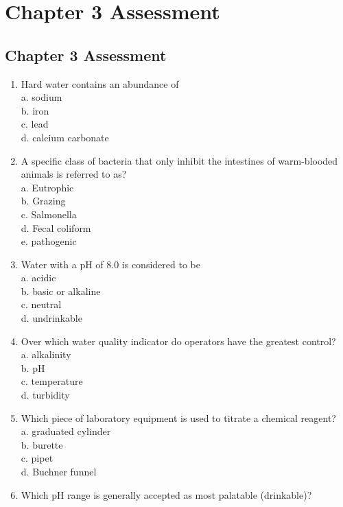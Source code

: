 
\chapter*{Chapter 3 Assessment}
\section*{Chapter 3 Assessment}
\begin{enumerate}[1.]

\item Hard water contains an abundance of\\
a. sodium\\
b. iron\\
c. lead\\
d. calcium carbonate\\
\item A specific class of bacteria that only inhibit the intestines of warm-blooded animals is referred to as?\\
a. Eutrophic\\
b. Grazing\\
c. Salmonella\\
d. Fecal coliform\\
e. pathogenic\\
\item Water with a pH of 8.0 is considered to be\\
a. acidic\\
b. basic or alkaline\\
c. neutral\\
d. undrinkable\\
\item Over which water quality indicator do operators have the greatest control?\\
a. alkalinity\\
b. pH\\
c. temperature\\
d. turbidity\\
\item Which piece of laboratory equipment is used to titrate a chemical reagent?\\
a. graduated cylinder\\
b. burette\\
c. pipet\\
d. Buchner funnel\\
\item Which pH range is generally accepted as most palatable (drinkable)?\\

\end{enumerate}
